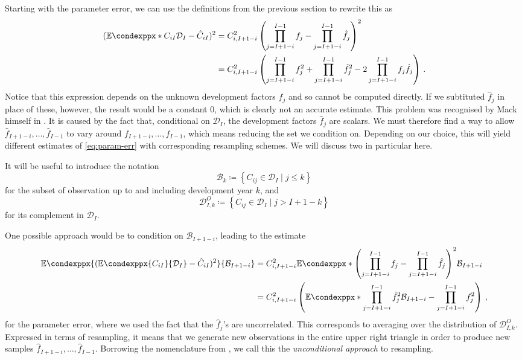 \documentclass[a4paper]{book}
\theoremstyle{plain}
\newcommand{\condexpp}{\mathbb{E}\condexppx}
\begin{document}
Starting with the parameter error, we can use the definitions from the previous section to rewrite this as
\begin{align} \label{eq:param-err}
  (\condexpp*{C_{iI}}{\mathcal{D}_I} - \hat{C}_{iI})^2 &= C^2_{i, I+1-i} \left( \prod_{j=I+1-i}^{I-1}f_j - \prod_{j=I+1-i}^{I-1}\hat{f}_j \right)^2 \\
  &= C^2_{i, I+1-i} \left( \prod_{j=I+1-i}^{I-1}f^2_j + \prod_{j=I+1-i}^{I-1}\hat{f}^2_j - 2 \prod_{j=I+1-i}^{I-1}f_j \hat{f}_j \right) \,.
\end{align}
Notice that this expression depends on the unknown development factors $f_j$ and so cannot be computed directly. If we subtituted $\hat{f}_j$ in place of these, however, the result would be a constant $0$, which is clearly not an accurate estimate. This problem was recognised by Mack himself in \cite[Appendix D]{mack:chain-ladder-variability}. It is caused by the fact that, conditional on $\mathcal{D}_I$, the development factors $\hat{f}_j$ are scalars. We must therefore find a way to allow $\hat{f}_{I + 1 - i}, \dots, \hat{f}_{I - 1}$ to vary around $f_{I + 1 - i}, \dots, f_{I - 1}$, which means reducing the set we condition on. Depending on our choice, this will yield different estimates of \cref{eq:param-err} with corresponding resampling schemes. We will discuss two in particular here.

It will be useful to introduce the notation
\begin{equation}
    \mathcal{B}_k \coloneqq \left \{ C_{ij} \in \mathcal{D}_I \mid j \leq k \right \}
\end{equation}
for the subset of observation up to and including development year $k$, and
\begin{equation}
    \mathcal{D}^O_{I, k} \coloneqq \left \{ C_{ij} \in \mathcal{D}_I \mid j > I + 1 - k \right \}
\end{equation}
for its complement in $\mathcal{D}_I$.

One possible approach would be to condition on $\mathcal{B}_{I+1-i}$, leading to the estimate
\begin{align} \label{eq:uncond-param-err}
    \condexpp{(\condexpp{C_{iI}}{\mathcal{D}_I} - \hat{C}_{iI})^2}{\mathcal{B}_{I+1-i}} &= C^2_{i, I+1-i} \condexpp*{\left( \prod_{j=I+1-i}^{I-1}f_j - \prod_{j=I+1-i}^{I-1}\hat{f}_j \right)^2}{\mathcal{B}_{I+1-i}} \\
    &= C^2_{i, I+1-i} \left( \condexpp*{\prod_{j=I+1-i}^{I-1}\hat{f}^2_j}{\mathcal{B}_{I+1-i}} - \prod_{j=I+1-i}^{I-1}f^2_j \right)\,,
\end{align}
for the parameter error, where we used the fact that the $\hat{f}_j$'s are uncorrelated. This corresponds to averaging over the distribution of $\mathcal{D}^O_{I, k}$. Expressed in terms of resampling, it means that we generate new observations in the entire upper right triangle in order to produce new samples $\hat{f}_{I + 1 - i}, 
\dots, \hat{f}_{I - 1}$. Borrowing the nomenclature from \cite{wuthrich:chain-ladder-msep}, we call this the \emph{unconditional approach} to resampling.
\end{document}
